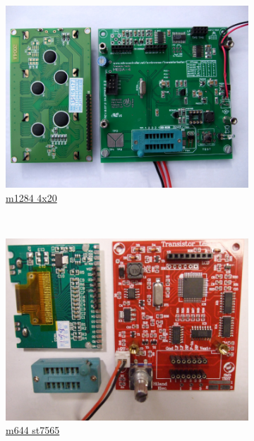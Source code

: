 \documentclass[pdftex,12pt,a4paper,english]{article}
\begin{document}
\begin{figure}[H]
  \begin{subfigure}[b]{.3\textwidth}
    \centering
    \includegraphics[width=1.\textwidth]{../PNG/m644_4x20.JPG}
	  \\ \vspace{-0.5em}
	  {\href{run:./trunk/mega644_LCD2004/}{m1284 4x20}}
  \end{subfigure}
~
  \begin{subfigure}[b]{.3\textwidth}	%
    \centering
    \includegraphics[width=1.\textwidth]{../PNG/m644_hiland.JPG}
	  \\ \vspace{-0.5em}
	  {\href{run:./trunk/mega644_hiland_m644/}{m644 st7565}}

\end{subfigure}
\end{figure}
\end{document}

